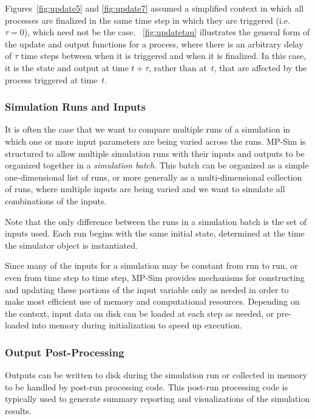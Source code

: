 \documentclass[12pt]{article}
\newcommand{\mpsim}[0]{{MP-Sim}}
\numberwithin{equation}{section}
\numberwithin{table}{section}
\numberwithin{figure}{section}
\begin{document}
Figures~\ref{fig:update5} and \ref{fig:update7} assumed a simplified context in which all processes are finalized in the same time step in which they are triggered (i.e. $\tau = 0$), which need not be the case. \figurename~\ref{fig:updatetau} illustrates the general form of the update and output functions for a process, where there is an arbitrary delay of $\tau$ time steps between when it is triggered and when it is finalized. In this case, it is the state and output at time $t+\tau$, rather than at~$t$, that are affected by the process triggered at time~$t$.

\subsubsection{Simulation Runs and Inputs}

It is often the case that we want to compare multiple runs of a simulation in which one or more input parameters are being varied across the runs. \mpsim{} is structured to allow multiple simulation runs with their inputs and outputs to be organized together in a \emph{simulation batch}. This batch can be organized as a simple one-dimensional list of runs, or more generally as a multi-dimensional collection of runs, where multiple inputs are being varied and we want to simulate all combinations of the inputs.

Note that the only difference between the runs in a simulation batch is the set of inputs used. Each run begins with the same initial state, determined at the time the simulator object is instantiated.

Since many of the inputs for a simulation may be constant from run to run, or even from time step to time step, \mpsim{} provides mechanisms for constructing and updating these portions of the input variable only as needed in order to make most efficient use of memory and computational resources. Depending on the context, input data on disk can be loaded at each step as needed, or pre-loaded into memory during initialization to speed up execution.

\subsubsection{Output Post-Processing}

Outputs can be written to disk during the simulation run or collected in memory to be handled by post-run processing code. This post-run processing code is typically used to generate summary reporting and visualizations of the simulation results.
\end{document}
